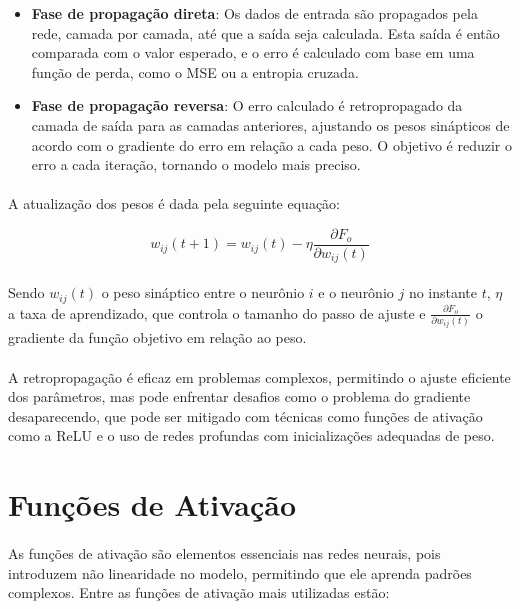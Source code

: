 \begin{itemize}
	\item \textbf{Fase de propagação direta}: Os dados de entrada são propagados pela rede, camada por camada, até que a saída seja calculada. Esta saída é então comparada com o valor esperado, e o erro é calculado com base em uma função de perda, como o \ac{MSE} ou a entropia cruzada.
	\item \textbf{Fase de propagação reversa}: O erro calculado é retropropagado da camada de saída para as camadas anteriores, ajustando os pesos sinápticos de acordo com o gradiente do erro em relação a cada peso. O objetivo é reduzir o erro a cada iteração, tornando o modelo mais preciso.
\end{itemize}

\paragraph{} A atualização dos pesos é dada pela seguinte equação:

\begin{equation}
	w_{ij}(t+1) = w_{ij}(t) - \eta \frac{\partial F_o}{\partial w_{ij}(t)}
\end{equation}
\paragraph{} Sendo \(w_{ij}(t)\) o peso sináptico entre o neurônio \(i\) e o neurônio \(j\) no instante \(t\), \(\eta\) a taxa de aprendizado, que controla o tamanho do passo de ajuste e \(\frac{\partial F_o}{\partial w_{ij}(t)}\) o gradiente da função objetivo em relação ao peso.

\paragraph{} A retropropagação é eficaz em problemas complexos, permitindo o ajuste eficiente dos parâmetros, mas pode enfrentar desafios como o problema do gradiente desaparecendo, que pode ser mitigado com técnicas como funções de ativação como a \ac{ReLU} e o uso de redes profundas com inicializações adequadas de peso.

\section{Funções de Ativação}

\paragraph{} As funções de ativação são elementos essenciais nas redes neurais, pois introduzem não linearidade no modelo, permitindo que ele aprenda padrões complexos. Entre as funções de ativação mais utilizadas estão:

